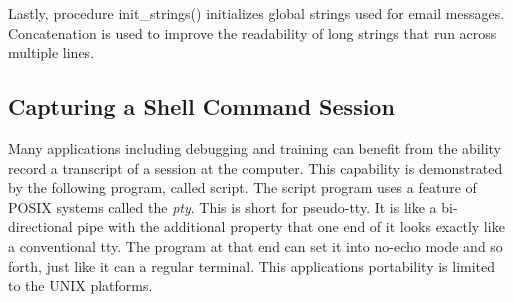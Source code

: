 Lastly, procedure \textsf{init\_strings()} initializes global strings
used for email messages. Concatenation is used to improve the
readability of long strings that run across multiple lines.


\subsection{Capturing a Shell Command Session}

Many applications including debugging and training can benefit from the
ability record a transcript of a session at the computer. This
capability is demonstrated by the following program, called
\textsf{script}. The \textsf{script} program uses a feature of POSIX
systems called the \textit{pty}. This is short for
pseudo-tty. It is like a bi-directional pipe with the
additional property that one end of it looks exactly like a
conventional tty. The program at that end can set it into
{\textquotedbl}no-echo{\textquotedbl} mode and so forth, just like it
can a regular terminal. This application{\textquotesingle}s portability
is limited to the UNIX platforms.

